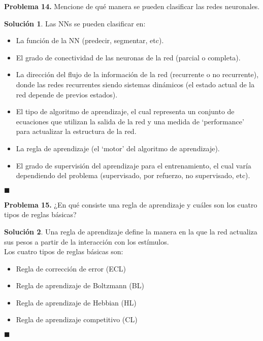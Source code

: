 \documentclass[12pt]{article}
\theoremstyle{plain}
\theoremstyle{definition}
\theoremstyle{definition}
\theoremstyle{definition}
\newtheorem*{solution}{Solución}
\begin{document}
 \noindent \textbf{Problema 14.} Mencione de qué manera se pueden clasificar las redes neuronales.

\begin{solution}
Las NNs se pueden clasificar en:
\begin{itemize}
    \item[1.] La función de la NN (predecir, segmentar, etc).
    \item[2.] El grado de conectividad de las neuronas de la red (parcial o completa).
    \item[3.] La dirección del flujo de la información de la red (recurrente o no recurrente), donde las redes recurrentes siendo sistemas dinámicos (el estado actual de la red depende de previos estados).
    \item[4.] El tipo de algoritmo de aprendizaje, el cual representa un conjunto de ecuaciones que utilizan la salida de la red y una medida de `performance' para actualizar la estructura de la red.
    \item[5.] La regla de aprendizaje (el `motor' del algoritmo de aprendizaje).
    \item[6.] El grado de supervisión del aprendizaje para el entrenamiento, el cual varía dependiendo del problema (supervisado, por refuerzo, no supervisado, etc). 
\end{itemize}
\end{solution}
\begin{flushright}
$\blacksquare$
\end{flushright}

\noindent \textbf{Problema 15.} ¿En qué consiste una regla de aprendizaje y cuáles son los cuatro tipos de reglas básicas?

\begin{solution}
Una regla de aprendizaje define la manera en la que la red actualiza sus pesos a partir de la interacción con los estímulos.\\
Los cuatro tipos de reglas básicas son:
\begin{itemize}
    \item Regla de corrección de error (ECL)
    \item Regla de aprendizaje de Boltzmann (BL)
    \item Regla de aprendizaje de Hebbian (HL)
    \item Regla de aprendizaje competitivo (CL)
\end{itemize}
\end{solution}
\begin{flushright}
$\blacksquare$
\end{flushright}
\end{document}
